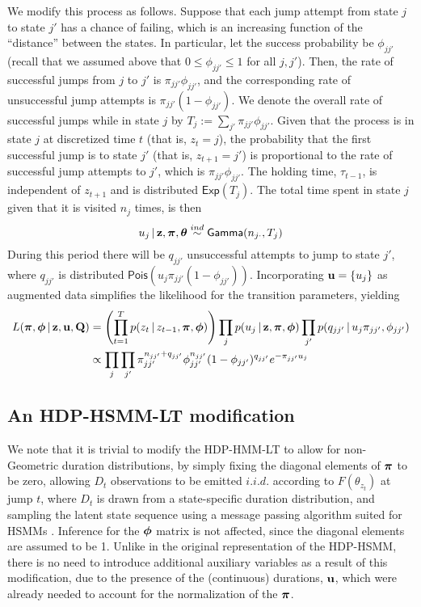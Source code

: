 We modify this process as follows.  
Suppose that each jump attempt from state $j$ to state $j'$ has a
chance of failing, which is an increasing function of the ``distance''
between the states.  In particular, let the success probability be
$\phi_{jj'}$ (recall that we assumed above that $0 \leq \phi_{jj'}
\leq 1$ for all $j,j'$).  Then, the rate of successful jumps from $j$
to $j'$ is $\pi_{jj'}\phi_{jj'}$, and the corresponding rate of unsuccessful jump
attempts is $\pi_{jj'}(1-\phi_{jj'})$.  We denote the overall rate of successful jumps
while in state $j$ by $T_j := \sum_{j'} \pi_{jj'} \phi_{jj'}$.
Given that the process is in state $j$ at discretized time $t$ (that is,
$z_{t} = j$), the probability that the first successful jump is to
state $j'$ (that is, $z_{t+1} = j'$) 
is proportional to the rate of successful jump attempts to $j'$, which
is $\pi_{jj'}\phi_{jj'}$.  The holding time, $\tau_{t-1}$, is
independent of $z_{t+1}$ and is distributed $\mathsf{Exp}(T_j)$.  The
total time spent in state $j$ given that it is visited $n_{j}$ times,
is then
\begin{equation}
u_j \, \vert \, \mathbf{z}, \boldsymbol{\pi}, \boldsymbol{\theta} \stackrel{ind}{\sim} \mathsf{Gamma}(n_{j\cdot},T_j)
\end{equation}
During this period there will be $q_{jj'}$
unsuccessful attempts to jump to state $j'$, where $q_{jj'}$ is distributed $\mathsf{Pois}(u_j
\pi_{jj'}(1 - \phi_{jj'}))$.  Incorporating
$\mathbf{u} = \{u_j\}$ as augmented data simplifies the likelihood for the transition
parameters, yielding
\begin{align}
  L(\boldsymbol{\pi}, \boldsymbol{\phi} \, \vert \, \mathbf{z}, \mathbf{u}, \mathbf{Q}) &= \left(\prod_{t=1}^T p(z_{t} \, \vert \,
    z_{t-1}, \boldsymbol{\pi}, \boldsymbol{\phi})\right) \prod_{j} p(u_j \, \vert \, \mathbf{z}, \boldsymbol{\pi}, \boldsymbol{\phi})
  \prod_{j'} p(q_{jj'} \, \vert \, u_j \pi_{jj'}, \phi_{jj'}) \notag \\
  &\propto \prod_{j} \prod_{j'} \pi_{jj'}^{n_{jj'} + q_{jj'}} \phi_{jj'}^{n_{jj'}}
  (1-\phi_{jj'})^{q_{jj'}} e^{-\pi_{jj'}u_j} \label{eq:joint-likelihood}
\end{align}

\subsection{An HDP-HSMM-LT modification}
\label{sec:an-hsmm-modification}

We note that it is trivial to modify the HDP-HMM-LT to allow for
non-Geometric duration distributions, by simply fixing the diagonal
elements of $\boldsymbol{\pi}$ to be zero, allowing $D_t$ observations to be
emitted $i.i.d.$ according to $F(\theta_{z_t})$ at jump $t$, where $D_t$ is drawn
from a state-specific duration distribution, and sampling the
latent state sequence using a message passing algorithm suited for
HSMMs \cite{johnson2013bayesian}.  Inference for the $\boldsymbol{\phi}$ matrix
is not affected, since the diagonal elements are assumed to be 1.
Unlike in the original representation of the HDP-HSMM, there is no need to introduce
additional auxiliary variables as a result of this modification, due
to the presence of the (continuous) durations, $\mathbf{u}$, which were
already needed to account for the normalization of the $\boldsymbol{\pi}$.

